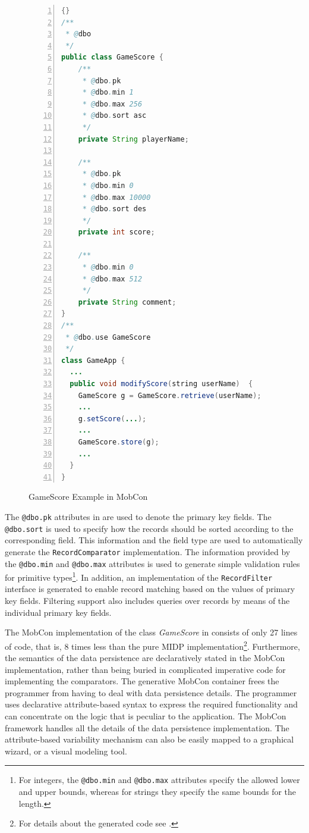 \newpage
\begin{figure}[ht]
	\begin{center}
		\begin{minipage}[t]{8cm}
		\begin{scriptsize}
\begin{lstlisting}[numbers=left,language=Java,frame=leftline]{}
/**
 * @dbo
 */
public class GameScore {
    /**
     * @dbo.pk
     * @dbo.min 1
     * @dbo.max 256
     * @dbo.sort asc
     */
    private String playerName;
    
    /**
     * @dbo.pk
     * @dbo.min 0
     * @dbo.max 10000
     * @dbo.sort des
     */
    private int score;
    
    /**
     * @dbo.min 0
     * @dbo.max 512
     */
    private String comment;
}
/**
 * @dbo.use GameScore
 */
class GameApp {
  ...
  public void modifyScore(string userName)  {
    GameScore g = GameScore.retrieve(userName);
    ...
    g.setScore(...);
    ...
    GameScore.store(g);
    ...
  }
}
\end{lstlisting}
		\end{scriptsize}
			\end{minipage}
	\end{center}
	\caption{GameScore Example in MobCon}
\label{fig:gamescore}
\end{figure}


The \texttt{@dbo.pk} attributes in  are used to denote the primary key fields. The {\tt @dbo.sort} is used to specify how the records should be sorted according to the corresponding field. This information and the field type are used to automatically generate the {\tt Re\-cord\-Com\-pa\-ra\-tor} implementation. The information provided by the {\tt @dbo.min} and {\tt @dbo.max} attributes is used to generate simple validation rules for primitive types\footnote{For integers, the {\tt @dbo.min} and {\tt @dbo.max} attributes specify the allowed lower and upper bounds, whereas for strings they specify the same bounds for the length.}. In addition, an implementation of the {\tt Re\-cord\-Fil\-ter} interface is generated to enable record matching based on the values of primary key fields. Filtering support also includes queries over records by means of the individual primary key fields.

The MobCon implementation of the class \textit{GameScore} in  consists of only 27 lines of code, that is, 8 times less than the pure MIDP implementation\footnote{For details about the generated code see \cite{vasian.mobcon.03}.}. Furthermore, the semantics of  the data persistence are declaratively stated in the MobCon implementation, rather than being buried in complicated imperative code for implementing the comparators. The generative MobCon container frees the programmer from having to deal with data persistence details. The programmer uses declarative attribute-based syntax to express the required functionality and can concentrate on the logic that is peculiar to the application. The MobCon framework handles all the details of the data persistence implementation. The attribute-based variability mechanism can also be easily mapped to a graphical wizard, or a visual modeling tool.

